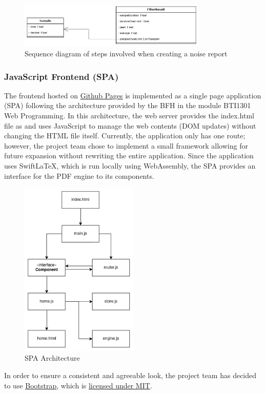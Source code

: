 \begin{figure}[H]
    \centering
    \includegraphics[width=0.8\textwidth]{../assets/interface.png}
    \caption{Sequence diagram of steps involved when creating a noise report}
\end{figure}

\subsubsection{JavaScript Frontend (SPA)}
The frontend hosted on \href{https://decibel-threshold-event-displayer.github.io/}{Github Pages} is implemented as a single page application (SPA) following the architecture provided by the BFH in the module BTI1301 Web Programming.
In this architecture, the web server provides the index.html file as and uses JavaScript to manage the web contents (DOM updates) without changing the HTML file itself. Currently, the application only has one route; however, the project team chose to
implement a small framework allowing for future expansion without rewriting the entire application. Since the application uses SwiftLaTeX, which is run locally using WebAssembly, the SPA provides an interface for the PDF engine to
its components.
\begin{figure}[H]
    \centering
    \includegraphics[width=0.5\textwidth]{../assets/spa_diagram.png}
    \caption{SPA Architecture}
\end{figure}
In order to ensure a consistent and agreeable look, the project team has decided to use \href{https://getbootstrap.com/}{Bootstrap}, which is \href{https://github.com/twbs/bootstrap/blob/main/LICENSE}{licensed under MIT}.

